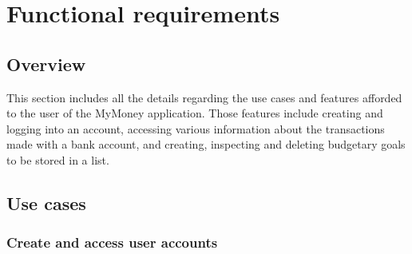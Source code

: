 \documentclass[letterpaper]{article}
\begin{document}
\section{Functional requirements}

	\subsection{Overview}
	
		This section includes all the details regarding the use cases and features afforded to the user of the MyMoney application. Those features include creating and logging into an account, accessing various information about the transactions made with a bank account, and creating, inspecting and deleting budgetary goals to be stored in a list.
	
	\subsection{Use cases}
	
		\subsubsection{Create and access user accounts}
		
\end{document}
